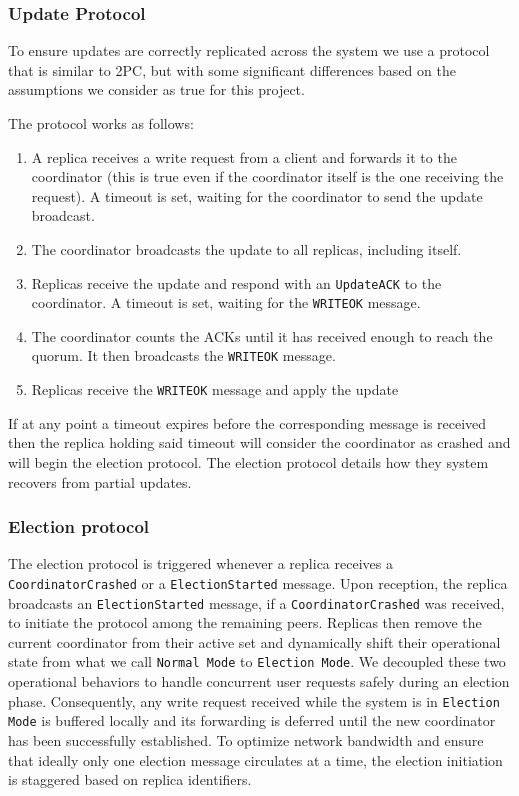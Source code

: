 \subsubsection{Update Protocol}
To ensure updates are correctly replicated across the system we use a protocol that is similar to 2PC, but with some significant differences
based on the assumptions we consider as true for this project.

The protocol works as follows:
\begin{enumerate}
    \item A replica receives a write request from a client and forwards it to the coordinator (this is true even if the coordinator itself
        is the one receiving the request). A timeout is set, waiting for the coordinator to send the update broadcast.
    \item The coordinator broadcasts the update to all replicas, including itself.
    \item Replicas receive the update and respond with an \texttt{UpdateACK} to the coordinator. A timeout is set, waiting for the
        \texttt{WRITEOK} message.
    \item The coordinator counts the ACKs until it has received enough to reach the quorum. It then broadcasts the \texttt{WRITEOK} message.
    \item Replicas receive the \texttt{WRITEOK} message and apply the update
\end{enumerate}

If at any point a timeout expires before the corresponding message is received then the replica holding said timeout will consider the
coordinator as crashed and will begin the election protocol. The election protocol details how they system recovers from partial updates.

\subsubsection{Election protocol}
The election protocol is triggered whenever a replica receives a \texttt{CoordinatorCrashed} or a \texttt{ElectionStarted} message. Upon reception, the replica broadcasts an \texttt{ElectionStarted} message, if a \texttt{CoordinatorCrashed} was received, to initiate the protocol among the remaining peers. Replicas then remove the current coordinator from their active set and dynamically shift their operational state from what we call \texttt{Normal Mode} to \texttt{Election Mode}. 
We decoupled these two operational behaviors to handle concurrent user requests safely during an election phase. Consequently, any write request received while the system is in \texttt{Election Mode} is buffered locally and its forwarding is deferred until the new coordinator has been successfully established.
To optimize network bandwidth and ensure that ideally only one election message circulates at a time, the election initiation is staggered based on replica identifiers.

